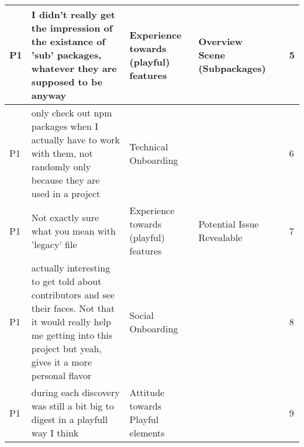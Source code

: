 \begin{appendices}
\begin{landscape}
\begin{longtable}{|p{0.8cm}|p{7cm}|p{3cm}|p{3cm}|p{5.5cm}|p{0.5cm}|}
      P1                   & I didn't really get the impression of the existance of 'sub' packages, whatever they are supposed to be anyway                                                                                                                                                              & Experience towards (playful) features    & Overview Scene (Subpackages)       &                                                                                                                                                    & 5            \\ \hline
      P1                   & only check out npm packages when I actually have to work with them, not randomly only because they are used in a project                                                                                                                                                    & Technical Onboarding                     &                                    &                                                                                                                                                    & 6            \\ \hline
      P1                   & Not exactly sure what you mean with 'legacy' file                                                                                                                                                                                                                           & Experience towards (playful) features    & Potential Issue Revealable         &                                                                                                                                                    & 7            \\ \hline
      P1                   & actually interesting to get told about contributors and see their faces. Not that it would really help me getting into this project but yeah, gives it a more personal flavor                                                                                               & Social Onboarding                        &                                    &                                                                                                                                                    & 8            \\ \hline
      P1                   & during each discovery was still a bit big to digest in a playfull way I think                                                                                                                                                                                               & Attitude towards Playful elements        &                                    &                                                                                                                                                    & 9            \\ \hline

\end{longtable}
\end{landscape}
\end{appendices}
